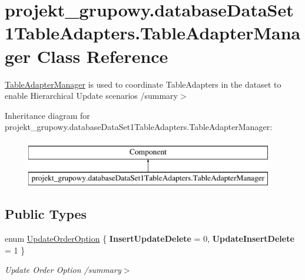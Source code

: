 \hypertarget{classprojekt__grupowy_1_1database_data_set1_table_adapters_1_1_table_adapter_manager}{}\section{projekt\+\_\+grupowy.\+database\+Data\+Set1\+Table\+Adapters.\+Table\+Adapter\+Manager Class Reference}
\label{classprojekt__grupowy_1_1database_data_set1_table_adapters_1_1_table_adapter_manager}


\hyperlink{classprojekt__grupowy_1_1database_data_set1_table_adapters_1_1_table_adapter_manager}{Table\+Adapter\+Manager} is used to coordinate Table\+Adapters in the dataset to enable Hierarchical Update scenarios /summary$>$  


Inheritance diagram for projekt\+\_\+grupowy.\+database\+Data\+Set1\+Table\+Adapters.\+Table\+Adapter\+Manager\+:\begin{figure}[H]
\begin{center}
\leavevmode
\includegraphics[height=2.000000cm]{classprojekt__grupowy_1_1database_data_set1_table_adapters_1_1_table_adapter_manager}
\end{center}
\end{figure}
\subsection*{Public Types}
\begin{DoxyCompactItemize}
\item 
\mbox{\label{classprojekt__grupowy_1_1database_data_set1_table_adapters_1_1_table_adapter_manager_ad394b93344d1252bbb4268ccb8f786af}} 
enum \hyperlink{classprojekt__grupowy_1_1database_data_set1_table_adapters_1_1_table_adapter_manager_ad394b93344d1252bbb4268ccb8f786af}{Update\+Order\+Option} \{ {\bfseries Insert\+Update\+Delete} = 0, 
{\bfseries Update\+Insert\+Delete} = 1
 \}\begin{DoxyCompactList}\small\item\em Update Order Option /summary$>$ \end{DoxyCompactList}
\end{DoxyCompactItemize}
